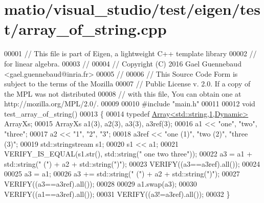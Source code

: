 \hypertarget{matio_2visual__studio_2test_2eigen_2test_2array__of__string_8cpp_source}{}\section{matio/visual\+\_\+studio/test/eigen/test/array\+\_\+of\+\_\+string.cpp}
\label{matio_2visual__studio_2test_2eigen_2test_2array__of__string_8cpp_source}

\begin{DoxyCode}
00001 \textcolor{comment}{// This file is part of Eigen, a lightweight C++ template library}
00002 \textcolor{comment}{// for linear algebra.}
00003 \textcolor{comment}{//}
00004 \textcolor{comment}{// Copyright (C) 2016 Gael Guennebaud <gael.guennebaud@inria.fr>}
00005 \textcolor{comment}{//}
00006 \textcolor{comment}{// This Source Code Form is subject to the terms of the Mozilla}
00007 \textcolor{comment}{// Public License v. 2.0. If a copy of the MPL was not distributed}
00008 \textcolor{comment}{// with this file, You can obtain one at http://mozilla.org/MPL/2.0/.}
00009 
00010 \textcolor{preprocessor}{#include "main.h"}
00011 
00012 \textcolor{keywordtype}{void} test\_array\_of\_string()
00013 \{
00014   \textcolor{keyword}{typedef} \hyperlink{group___core___module_class_eigen_1_1_array}{Array<std::string,1,Dynamic>} ArrayXs;
00015   ArrayXs a1(3), a2(3), a3(3), a3ref(3);
00016   a1 << \textcolor{stringliteral}{"one"}, \textcolor{stringliteral}{"two"}, \textcolor{stringliteral}{"three"};
00017   a2 << \textcolor{stringliteral}{"1"}, \textcolor{stringliteral}{"2"}, \textcolor{stringliteral}{"3"};
00018   a3ref << \textcolor{stringliteral}{"one (1)"}, \textcolor{stringliteral}{"two (2)"}, \textcolor{stringliteral}{"three (3)"};
00019   std::stringstream s1;
00020   s1 << a1;
00021   VERIFY\_IS\_EQUAL(s1.str(), std::string(\textcolor{stringliteral}{"  one    two  three"}));
00022   a3 = a1 + std::string(\textcolor{stringliteral}{" ("}) + a2 + std::string(\textcolor{stringliteral}{")"});
00023   VERIFY((a3==a3ref).all());
00024 
00025   a3 = a1;
00026   a3 += std::string(\textcolor{stringliteral}{" ("}) + a2 + std::string(\textcolor{stringliteral}{")"});
00027   VERIFY((a3==a3ref).all());
00028 
00029   a1.swap(a3);
00030   VERIFY((a1==a3ref).all());
00031   VERIFY((a3!=a3ref).all());
00032 \}
\end{DoxyCode}
